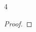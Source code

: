 \documentclass{article}
\begin{document}
\begin{PROB}{4}\label{Problem 4.}
\end{PROB}
\begin{proof}

    
    
    
    
    
    
    
    


\end{proof}
\end{document}
